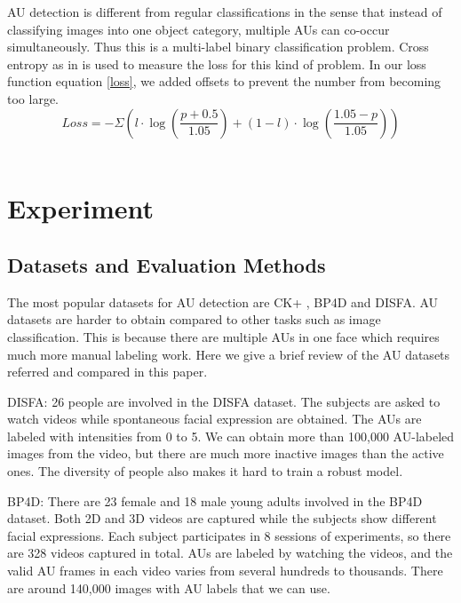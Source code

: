 \documentclass[a4paper, 10pt, conference]{ieeeconf}      %
\begin{document}
AU detection is different from regular classifications in the sense that instead of classifying images into one object category, multiple AUs can co-occur simultaneously. Thus this is a multi-label binary classification problem. Cross entropy as in \cite{p22} is used to measure the loss for this kind of problem.  In our loss function equation \ref{loss}, we added offsets to prevent the number from becoming too large.
\begin{equation}
\label{loss}
Loss=-\Sigma(l\cdot\log(\frac{p+0.5}{1.05})+(1-l)\cdot\log(\frac{1.05-p}{1.05}))
\end{equation}\
\section{Experiment}

\subsection{Datasets  and Evaluation Methods}

The most popular datasets for AU detection are CK+ \cite{p28}, BP4D\cite{p27} and DISFA\cite{p29}. AU datasets are harder to obtain compared to other tasks such as image classification. This is because there are multiple AUs in one face which requires much more manual labeling work. Here we give a brief review of the AU datasets referred and compared in this paper.

DISFA: 26 people are involved in the DISFA dataset. The subjects are asked to watch videos while spontaneous facial expression are obtained. The AUs are labeled with intensities from 0 to 5. We can obtain more than 100,000 AU-labeled images from the video, but there are much more inactive images than the active ones. The diversity of people also makes it hard to train a robust model. 

BP4D:  There are 23 female and 18 male young adults involved in the BP4D dataset. Both 2D and 3D videos are captured while the subjects show different facial expressions. Each subject participates in 8 sessions of experiments, so there are 328 videos captured in total. AUs are labeled by watching the videos, and the valid AU frames in each video varies from several hundreds to thousands. There are around 140,000 images with AU labels that we can use. 
\end{document}
